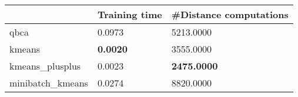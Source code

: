 \begin{table}[htbp]
\centering
\begin{tabular}{lll}
\toprule
 & Training time & #Distance computations \\
\midrule
qbca & 0.0973 & 5213.0000 \\
kmeans & \textbf{0.0020} & 3555.0000 \\
kmeans_plusplus & 0.0023 & \textbf{2475.0000} \\
minibatch_kmeans & 0.0274 & 8820.0000 \\
\bottomrule
\end{tabular}
\end{table}
